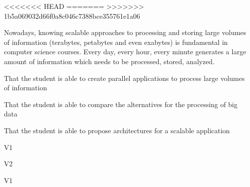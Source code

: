 \begin{syllabus}

<<<<<<< HEAD
=======
>>>>>>> 1b5a069032d66f0a8c046c7388bce355761e1a06

\begin{justification}
Nowadays, knowing scalable approaches to processing and storing large volumes of information (terabytes, petabytes and even exabytes) is fundamental in computer science courses. Every day, every hour, every minute generates a large amount of information which needs to be processed, stored, analyzed.
\end{justification}

\begin{goals}
\item That the student is able to create parallel applications to process large volumes of information
\item That the student is able to compare the alternatives for the processing of big data
\item That the student is able to propose architectures for a scalable application
\end{goals}

\begin{outcomes}{V1}
    \item {} 
    \item {} 
    \item {} 
    \item {} 
\end{outcomes}

\begin{outcomes}{V2}
    \item {}
    \item {} 
    \item {} 
\end{outcomes}

\begin{competences}{V1}
    \item {}
    \item {} 
    \item {} 
    \item {} 
    \item {} 
\end{competences}


\end{syllabus}
